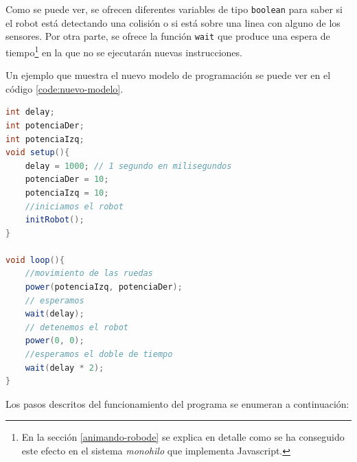Como se puede ver, se ofrecen diferentes variables de tipo \texttt{boolean} para saber si el robot está detectando una colisión o si está sobre una linea con alguno de los sensores. Por otra parte, se ofrece la función \texttt{wait} que produce una espera de tiempo\footnote{En la sección \ref{animando-robode} se explica en detalle como se ha conseguido este efecto en el sistema \emph{monohilo} que implementa Javascript.} en la que no se ejecutarán nuevas instrucciones.

%
%

Un ejemplo que muestra el nuevo modelo de programación se puede ver en el código \ref{code:nuevo-modelo}.

\begin{lstlisting}[language={Java},label={code:nuevo-modelo}, caption={Programa de ejemplo que mueve al robot con el nuevo Modelo de programación establecido para el simulador.}]
int delay;
int potenciaDer;
int potenciaIzq;
void setup(){
	delay = 1000; // 1 segundo en milisegundos
	potenciaDer = 10;
	potenciaIzq = 10;
	//iniciamos el robot
	initRobot();
}

void loop(){
	//movimiento de las ruedas
	power(potenciaIzq, potenciaDer); 
	// esperamos 
	wait(delay);
	// detenemos el robot
	power(0, 0);
	//esperamos el doble de tiempo
	wait(delay * 2);
}
\end{lstlisting}

Los pasos descritos del funcionamiento del programa se enumeran a continuación:

